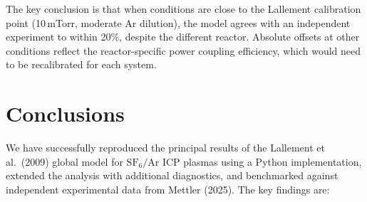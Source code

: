 \documentclass[11pt,a4paper]{article}
\newcommand{\SFsix}{\mathrm{SF}_6}
\newcommand{\Ar}{\mathrm{Ar}}
\begin{document}
The key conclusion is that when conditions are close to the Lallement calibration point (10\,mTorr, moderate Ar dilution), the model agrees with an independent experiment to within 20\%, despite the different reactor.  Absolute offsets at other conditions reflect the reactor-specific power coupling efficiency, which would need to be recalibrated for each system.

\section{Conclusions}

We have successfully reproduced the principal results of the Lallement et al.\ (2009) global model for $\SFsix/\Ar$ ICP plasmas using a Python implementation, extended the analysis with additional diagnostics, and benchmarked against independent experimental data from Mettler (2025).  The key findings are:
\end{document}
